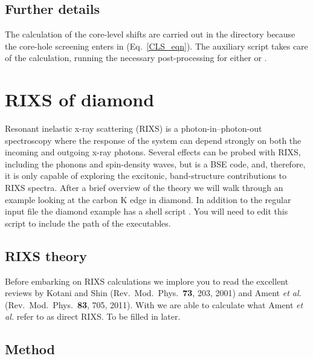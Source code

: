 \documentclass[11pt]{report}
\begin{document}
\subsection{Further details}

The calculation of the core-level shifts are carried out in the  directory because the core-hole screening enters in (Eq.~\ref{CLS_eqn}). 
The auxiliary script  takes care of the calculation, running the necessary post-processing for either  or . 


\section{RIXS of diamond}

Resonant inelastic x-ray scattering (RIXS) is a photon-in--photon-out spectroscopy where the response of the system can depend strongly on both the incoming and outgoing x-ray photons.
Several effects can be probed with RIXS, including the phonons and spin-density waves, but  is a BSE code, and, therefore, it is only capable of exploring the excitonic, band-structure contributions to RIXS spectra. 
After a brief overview of the theory we will walk through an example looking at the carbon K edge in diamond.
In addition to the regular input file the diamond example has a shell script . 
You will need to edit this script to include the path of the  executables.

\subsection{RIXS theory}
Before embarking on RIXS calculations we implore you to read the excellent reviews by Kotani and Shin (Rev.\ Mod.\ Phys.\ {\bf 73}, 203, 2001) and Ament {\it et al.} (Rev.\ Mod.\ Phys.\ {\bf 83}, 705, 2011). With  we are able to calculate what Ament {\it et al.} refer to as direct RIXS. To be filled in later.

\subsection{Method}
\end{document}
